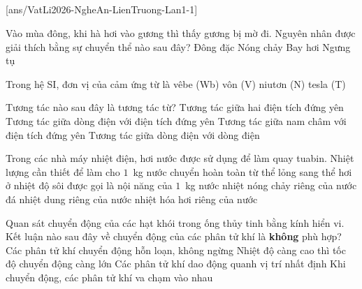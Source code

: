 	\subsection*{}
	\setcounter{ex}{0}
	[ans/VatLi2026-NgheAn-LienTruong-Lan1-1]

	\begin{ex}%
		Vào mùa đông, khi hà hơi vào gương thì thấy gương bị mờ đi. Nguyên nhân được giải thích bằng sự chuyển thể nào sau đây?
		\choice
		{Đông đặc}
		{Nóng chảy}
		{Bay hơi}
		{\True Ngưng tụ}
	\end{ex}

	\begin{ex}%
		Trong hệ SI, đơn vị của cảm ứng từ là
		\choice
		{vêbe (Wb)}
		{vôn (V)}
		{niutơn (N)}
		{\True tesla (T)}
	\end{ex}

	\begin{ex}%
		Tương tác nào sau đây là tương tác từ?
		\choice
		{Tương tác giữa hai điện tích đứng yên}
		{Tương tác giữa dòng điện với điện tích đứng yên}
		{Tương tác giữa nam châm với điện tích đứng yên}
		{\True Tương tác giữa dòng điện với dòng điện}
	\end{ex}

	\begin{ex}%
		Trong các nhà máy nhiệt điện, hơi nước được sử dụng để làm quay tuabin. Nhiệt lượng cần thiết để làm cho $1$~kg nước chuyển hoàn toàn từ thể lỏng sang thể hơi ở nhiệt độ sôi được gọi là
		\choice
		{nội năng của $1$~kg nước}
		{nhiệt nóng chảy riêng của nước đá}
		{nhiệt dung riêng của nước}
		{\True nhiệt hóa hơi riêng của nước}
	\end{ex}

	\begin{ex}%
		Quan sát chuyển động của các hạt khói trong ống thủy tinh bằng kính hiển vi. Kết luận nào sau đây về chuyển động của các phân tử khí là \textbf{không} phù hợp?
		\choice
		{Các phân tử khí chuyển động hỗn loạn, không ngừng}
		{Nhiệt độ càng cao thì tốc độ chuyển động càng lớn}
		{\True Các phân tử khí dao động quanh vị trí nhất định}
		{Khi chuyển động, các phân tử khí va chạm vào nhau}
	\end{ex}

